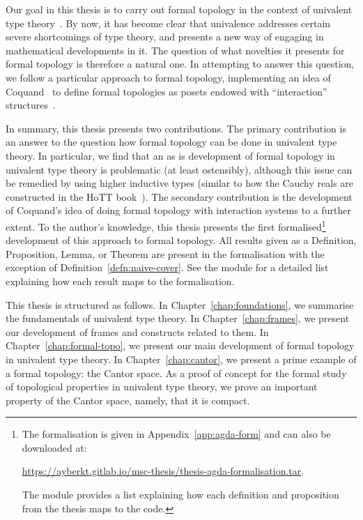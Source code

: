 Our goal in this thesis is to carry out formal topology in the context of univalent type
theory~\cite{hottbook, escardo-uf-intro}. By now, it has become clear that univalence
addresses certain severe shortcomings of type theory, and presents a new way of engaging
in mathematical developments in it. The question of what novelties it presents for formal
topology is therefore a natural one. In attempting to answer this question, we follow a
particular approach to formal topology, implementing an idea of Coquand~\cite{coq-posets}
to define formal topologies as posets endowed with ``interaction''
structures~\cite{tree-sets, hancock-interaction-systems}.

In summary, this thesis presents two contributions. The primary contribution is an answer
to the question how formal topology can be done in univalent type theory. In particular,
we find that an as is development of formal topology in univalent type theory is
problematic (at least ostensibly), although this issue can be remedied by using higher
inductive types (similar to how the Cauchy reals are constructed in the HoTT
book~\cite{hottbook}). The secondary contribution is the development of Coquand's idea of
doing formal topology with interaction systems to a further extent. To the author's
knowledge, this thesis presents the first formalised\footnote{%
  The \veragda{} formalisation is given in Appendix~\ref{app:agda-form} and can also be
  downloaded at:
  \begin{center}
    \url{https://ayberkt.gitlab.io/msc-thesis/thesis-agda-formalisation.tar}.
  \end{center}
  The  module provides a list explaining how each definition and
  proposition from the thesis maps to the \veragda{} code.
}%
development of this approach to formal topology. All results given as a Definition,
Proposition, Lemma, or Theorem are present in the \veragda{} formalisation with the
exception of Definition~\ref{defn:naive-cover}. See the  module for a
detailed list explaining how each result maps to the \veragda{} formalisation.

This thesis is structured as follows. In Chapter~\ref{chap:foundations}, we summarise the
fundamentals of univalent type theory. In Chapter~\ref{chap:frames}, we present our
development of frames and constructs related to them. In Chapter~\ref{chap:formal-topo},
we present our main development of formal topology in univalent type theory. In
Chapter~\ref{chap:cantor}, we present a prime example of a formal topology: the Cantor
space. As a proof of concept for the formal study of topological properties in univalent
type theory, we prove an important property of the Cantor space, namely, that it is
compact.
